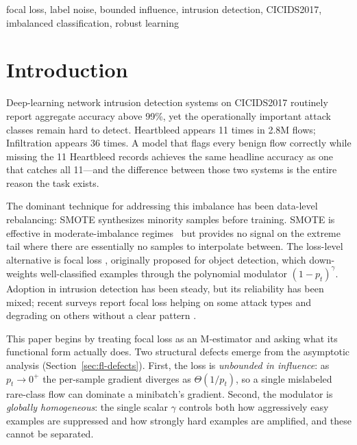 \documentclass[conference]{IEEEtran}
\theoremstyle{definition}
\begin{document}
\begin{IEEEkeywords}
focal loss, label noise, bounded influence, intrusion detection, CICIDS2017, imbalanced classification, robust learning
\end{IEEEkeywords}

\section{Introduction}
\label{sec:intro}

Deep-learning network intrusion detection systems on CICIDS2017 \cite{sharafaldin2018toward} routinely report aggregate accuracy above 99\%, yet the operationally important attack classes remain hard to detect. Heartbleed appears 11 times in 2.8M flows; Infiltration appears 36 times. A model that flags every benign flow correctly while missing the 11 Heartbleed records achieves the same headline accuracy as one that catches all 11---and the difference between those two systems is the entire reason the task exists.

The dominant technique for addressing this imbalance has been data-level rebalancing: SMOTE \cite{chawla2002smote} synthesizes minority samples before training. SMOTE is effective in moderate-imbalance regimes~\cite{he2009learning} but provides no signal on the extreme tail where there are essentially no samples to interpolate between. The loss-level alternative is focal loss \cite{lin2017focal}, originally proposed for object detection, which down-weights well-classified examples through the polynomial modulator $(1-p_t)^\gamma$. Adoption in intrusion detection has been steady, but its reliability has been mixed; recent surveys report focal loss helping on some attack types and degrading on others without a clear pattern \cite{cherukuri2025deep, zhang2025deep}.

This paper begins by treating focal loss as an M-estimator and asking what its functional form actually does. Two structural defects emerge from the asymptotic analysis (Section~\ref{sec:fl-defects}). First, the loss is \emph{unbounded in influence}: as $p_t \to 0^+$ the per-sample gradient diverges as $\Theta(1/p_t)$, so a single mislabeled rare-class flow can dominate a minibatch's gradient. Second, the modulator is \emph{globally homogeneous}: the single scalar $\gamma$ controls both how aggressively easy examples are suppressed and how strongly hard examples are amplified, and these cannot be separated.
\end{document}
